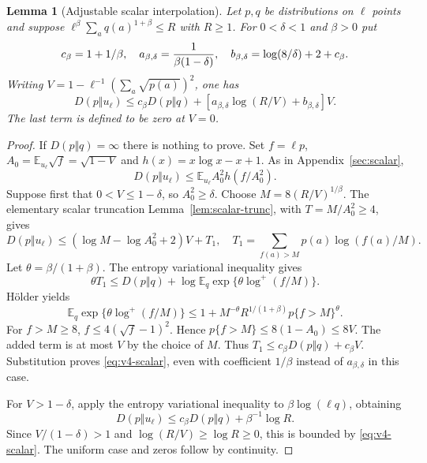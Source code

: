 \documentclass[11pt]{article}
\numberwithin{equation}{section}
\newtheorem{lemma}[theorem]{Lemma}
\theoremstyle{definition}\newtheorem{definition}[theorem]{Definition}
\theoremstyle{remark}\newtheorem{remark}[theorem]{Remark}
\newcommand{\E}{\mathbb E}
\begin{document}
\begin{lemma}[Adjustable scalar interpolation]\label{lem:v4-scalar}
Let $p,q$ be distributions on $\ell$ points and suppose
$\ell^\beta\sum_aq(a)^{1+\beta}\le R$ with $R\ge1$.
For $0<\delta<1$ and $\beta>0$ put
\[
 c_\beta=1+1/\beta,\quad
 a_{\beta,\delta}={1\over\beta(1-\delta)},\quad
 b_{\beta,\delta}=\log(8/\delta)+2+c_\beta.
\]
Writing $V=1-\ell^{-1}(\sum_a\sqrt{p(a)})^2$, one has
\begin{equation}\label{eq:v4-scalar}
 D(p\Vert u_\ell)\le c_\beta D(p\Vert q)
       +[a_{\beta,\delta}\log(R/V)+b_{\beta,\delta}]V.
\end{equation}
The last term is defined to be zero at $V=0$.
\end{lemma}
\begin{proof}
If $D(p\Vert q)=\infty$ there is nothing to prove. Set $f=\ell p$,
$A_0=\E_{u_\ell}\sqrt f=\sqrt{1-V}$ and $h(x)=x\log x-x+1$.
As in Appendix~\ref{sec:scalar},
\[
 D(p\Vert u_\ell)\le\E_{u_\ell} A_0^2h(f/A_0^2).
\]
Suppose first that $0<V\le1-\delta$, so $A_0^2\ge\delta$.
Choose $M=8(R/V)^{1/\beta}$. The elementary scalar truncation
Lemma~\ref{lem:scalar-trunc}, with $T=M/A_0^2\ge4$, gives
\[
 D(p\Vert u_\ell)\le(\log M-\log A_0^2+2)V+T_1,
 \quad T_1=\sum_{f(a)>M}p(a)\log(f(a)/M).
\]
Let $\theta=\beta/(1+\beta)$. The entropy variational inequality gives
\[
 \theta T_1\le D(p\Vert q)+\log\E_q
                 \exp\{\theta\log^+(f/M)\}.
\]
H\"older yields
\[
 \E_q\exp\{\theta\log^+(f/M)\}
 \le1+M^{-\theta}R^{1/(1+\beta)}p\{f>M\}^{\theta}.
\]
For $f>M\ge8$, $f\le4(\sqrt f-1)^2$. Hence
$p\{f>M\}\le8(1-A_0)\le8V$. The added term is at most $V$ by the
choice of $M$. Thus $T_1\le c_\beta D(p\Vert q)+c_\beta V$.
Substitution proves \eqref{eq:v4-scalar}, even with coefficient
$1/\beta$ instead of $a_{\beta,\delta}$ in this case.

For $V>1-\delta$, apply the entropy variational inequality to
$\beta\log(\ell q)$, obtaining
\[
 D(p\Vert u_\ell)\le c_\beta D(p\Vert q)+\beta^{-1}\log R.
\]
Since $V/(1-\delta)>1$ and $\log(R/V)\ge\log R\ge0$, this is bounded by
\eqref{eq:v4-scalar}. The uniform case and zeros follow by continuity.
\end{proof}
\end{document}
